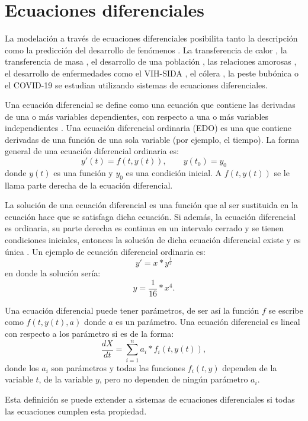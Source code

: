 \section{Ecuaciones diferenciales}\label{section:differential_equation_lineal_in_params}

La modelación a través de ecuaciones diferenciales posibilita tanto la descripción como la predicción del desarrollo de fenómenos \cite{zill2012first}. La transferencia de calor \cite{p-transferencia-calor}, la transferencia de masa \cite{p-transferencia-masa}, el desarrollo de una población \cite{p-desarrollo-poblacion}, las relaciones amorosas \cite{p-amor}, el desarrollo de enfermedades como el VIH-SIDA \cite{p-desarrollo-vih}, el cólera \cite{p-desarrollo-colera}, la peste bubónica \cite{p-desarrollo-peste} o el COVID-19 \cite{p-desarrollo-covid} se estudian utilizando sistemas de ecuaciones diferenciales.

Una ecuación diferencial se define como una ecuación que contiene las derivadas de una o más variables dependientes, con respecto a una o más variables independientes \cite{gaucel2014learning}. Una ecuación diferencial ordinaria (EDO) es una que contiene derivadas de una función de una sola variable (por ejemplo, el tiempo). La forma general de una ecuación diferencial ordinaria es:
$$y'(t)=f(t, y(t)), \qquad y(t_0) = y_0$$
donde $y(t)$ es una función y $y_0$ es una condición inicial. A $f(t, y(t))$ se le llama parte derecha de la ecuación diferencial.

La solución de una ecuación diferencial es una función que al ser sustituida en la ecuación hace que se satisfaga dicha ecuación. Si además, la ecuación diferencial es ordinaria, su parte derecha es continua en un intervalo cerrado y se tienen condiciones iniciales, entonces la solución de dicha ecuación diferencial existe y es única \cite{zill2012first}. Un ejemplo de ecuación diferencial ordinaria es:
$$y' = x * y^{\frac{1}{2}}$$
en donde la solución sería:
$$y = \frac{1}{16} * x^4.$$

Una ecuación diferencial puede tener parámetros, de ser así la función $f$ se escribe como $f(t, y(t), a)$ donde $a$ es un parámetro. Una ecuación diferencial es lineal con respecto a los parámetro si es de la forma:
$$\frac{dX}{dt} = \sum_{i=1}^{n} a_i * f_i(t, y(t)),$$
donde los $a_i$ son parámetros y todas las funciones $f_i(t,y)$ dependen de la variable $t$, de la variable $y$, pero no dependen de ningún parámetro $a_i$.

Esta definición se puede extender a sistemas de ecuaciones diferenciales si todas las ecuaciones cumplen esta propiedad.

